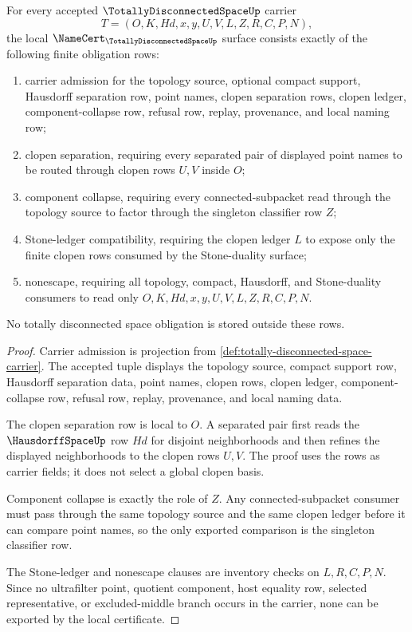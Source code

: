 \begin{theorem}
\label{thm:totally-disconnected-space-namecert-obligations}
For every accepted $\TotallyDisconnectedSpaceUp$ carrier
$$
T=(O,K,Hd,x,y,U,V,L,Z,R,C,P,N),
$$
the local $\NameCert_{\TotallyDisconnectedSpaceUp}$ surface consists exactly of the following finite obligation rows:
\begin{enumerate}
\item carrier admission for the topology source, optional compact support, Hausdorff separation row, point names, clopen separation rows, clopen ledger, component-collapse row, refusal row, replay, provenance, and local naming row;
\item clopen separation, requiring every separated pair of displayed point names to be routed through clopen rows $U,V$ inside $O$;
\item component collapse, requiring every connected-subpacket read through the topology source to factor through the singleton classifier row $Z$;
\item Stone-ledger compatibility, requiring the clopen ledger $L$ to expose only the finite clopen rows consumed by the Stone-duality surface;
\item nonescape, requiring all topology, compact, Hausdorff, and Stone-duality consumers to read only $O,K,Hd,x,y,U,V,L,Z,R,C,P,N$.
\end{enumerate}
No totally disconnected space obligation is stored outside these rows.
\end{theorem}
\begin{proof}
Carrier admission is projection from \autoref{def:totally-disconnected-space-carrier}. The accepted tuple displays the topology source, compact support row, Hausdorff separation data, point names, clopen rows, clopen ledger, component-collapse row, refusal row, replay, provenance, and local naming data.

The clopen separation row is local to $O$. A separated pair first reads the $\HausdorffSpaceUp$ row $Hd$ for disjoint neighborhoods and then refines the displayed neighborhoods to the clopen rows $U,V$. The proof uses the rows as carrier fields; it does not select a global clopen basis.

Component collapse is exactly the role of $Z$. Any connected-subpacket consumer must pass through the same topology source and the same clopen ledger before it can compare point names, so the only exported comparison is the singleton classifier row.

The Stone-ledger and nonescape clauses are inventory checks on $L,R,C,P,N$. Since no ultrafilter point, quotient component, host equality row, selected representative, or excluded-middle branch occurs in the carrier, none can be exported by the local certificate.
\end{proof}

